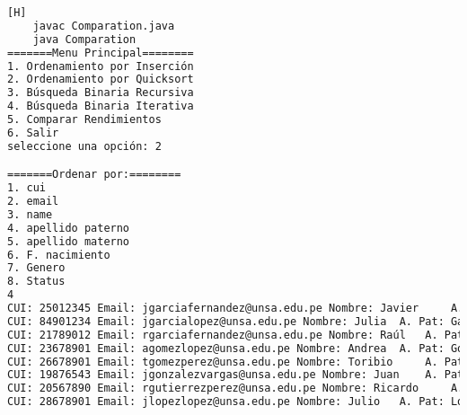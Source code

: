    	\begin{lstlisting}[language=bash,caption={Compilación y ejecución del código}][H]
    javac Comparation.java
    java Comparation
=======Menu Principal========
1. Ordenamiento por Inserción
2. Ordenamiento por Quicksort
3. Búsqueda Binaria Recursiva
4. Búsqueda Binaria Iterativa
5. Comparar Rendimientos
6. Salir
seleccione una opción: 2

=======Ordenar por:========
1. cui
2. email
3. name
4. apellido paterno
5. apellido materno
6. F. nacimiento
7. Genero
8. Status
4
CUI: 25012345 Email: jgarciafernandez@unsa.edu.pe Nombre: Javier	 A. Pat: Garcia A. Mat: Fernandez Fecha de Nacimiento: 1998-02-17 Genero: 1 Estado: 1
CUI: 84901234 Email: jgarcialopez@unsa.edu.pe Nombre: Julia	 A. Pat: Garcia A. Mat: Lopez Fecha de Nacimiento: 1993-04-19 Genero: 0 Estado: 1
CUI: 21789012 Email: rgarciafernandez@unsa.edu.pe Nombre: Raúl	 A. Pat: Garcia A. Mat: Fernandez Fecha de Nacimiento: 1992-07-22 Genero: 1 Estado: 1
CUI: 23678901 Email: agomezlopez@unsa.edu.pe Nombre: Andrea	 A. Pat: Gomez A. Mat: Lopez Fecha de Nacimiento: 1999-04-05 Genero: 0 Estado: 1
CUI: 26678901 Email: tgomezperez@unsa.edu.pe Nombre: Toribio	 A. Pat: Gomez A. Mat: Perez Fecha de Nacimiento: 1995-10-15 Genero: 1 Estado: 1
CUI: 19876543 Email: jgonzalezvargas@unsa.edu.pe Nombre: Juan	 A. Pat: Gonzalez A. Mat: Vargas Fecha de Nacimiento: 1995-09-20 Genero: 1 Estado: 1
CUI: 20567890 Email: rgutierrezperez@unsa.edu.pe Nombre: Ricardo	 A. Pat: Gutierrez A. Mat: Perez Fecha de Nacimiento: 2001-11-15 Genero: 1 Estado: 1
CUI: 28678901 Email: jlopezlopez@unsa.edu.pe Nombre: Julio	 A. Pat: Lopez A. Mat: Lopez Fecha de Nacimiento: 1991-07-13 Genero: 1 Estado: 0

  \end{lstlisting}

